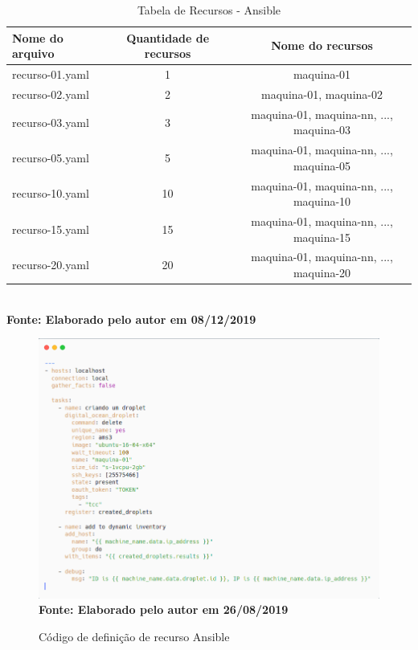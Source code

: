  \begin{table}[H]
	\centering
	\caption{\hspace{0.1cm} Tabela de Recursos - Ansible}
	\vspace{-0.3cm} %
	\label{tab:tabela1}
	\begin{tabular}{l|c|c}
  \hline
    \textbf{Nome do arquivo} & \textbf{Quantidade de recursos} & \textbf{Nome do recursos} \\
    \hline
           recurso-01.yaml   & 1  & maquina-01    \\
           recurso-02.yaml   & 2  & maquina-01, maquina-02     \\
           recurso-03.yaml   & 3  & maquina-01, maquina-nn, ..., maquina-03    \\
           recurso-05.yaml   & 5  & maquina-01, maquina-nn, ..., maquina-05       \\
           recurso-10.yaml   & 10  & maquina-01, maquina-nn, ..., maquina-10      \\
           recurso-15.yaml   & 15  & maquina-01, maquina-nn, ..., maquina-15     \\
           recurso-20.yaml   & 20  & maquina-01, maquina-nn, ..., maquina-20      \\

     \hline
 \end{tabular}
 	\vspace{.1cm}  %
	\small
	{\footnotesize\\ \textbf{Fonte:  Elaborado pelo autor em 08/12/2019}}
\end{table}

\begin{figure}[H]
	\centering	
	\caption[\hspace{0.1cm} Código de definição de recurso Ansible]{Código de definição de recurso Ansible}
	\vspace{-0.4cm}
	\includegraphics[width=1.0\textwidth]{artigo/figuras/codigo_ansible.png}
	 \vspace{-0.2cm}
	\\\textbf{\footnotesize Fonte: Elaborado pelo autor em 26/08/2019}
	\label{fig:figura1}
\end{figure}
\vspace{-0.5cm}

